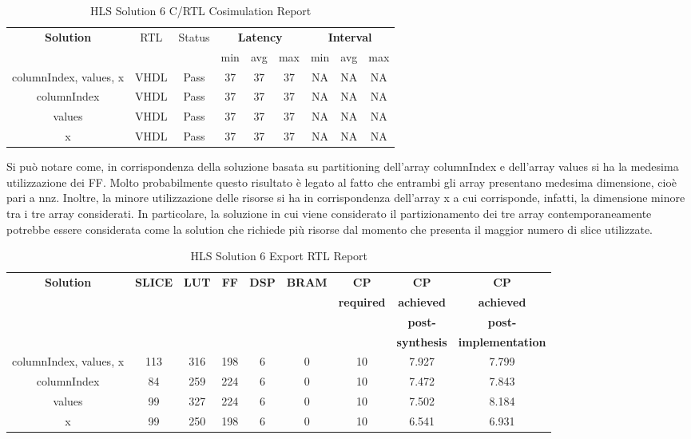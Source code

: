 \begin{table}[H]
	\centering
	\begin{tabular}{|c|c|c|c|c|c|c|c|c|}
		\hline
		\multicolumn{1}{|c|}{\textbf{Solution}} & \multicolumn{1}{|c|}{RTL} & \multicolumn{1}{|c|}{Status} & \multicolumn{3}{c|}{\textbf{Latency}} & \multicolumn{3}{c|}{\textbf{Interval}} \\
		& &  & min & avg & max & min & avg & max \\
		\hline
		columnIndex, values, x & VHDL & Pass & 37 & 37 & 37 & NA & NA & NA \\
		\hline
		columnIndex & VHDL & Pass & 37 & 37 & 37 & NA & NA & NA \\
		\hline
		values & VHDL & Pass & 37 & 37 & 37 & NA & NA & NA \\
		\hline
		x & VHDL & Pass & 37 & 37 & 37 & NA & NA & NA \\
		\hline
	\end{tabular}
	\caption{HLS Solution 6 C/RTL Cosimulation Report }
	\label{tab:hls-solution-6-cosimulation-report}
\end{table}

Si può notare come, in corrispondenza della soluzione basata su partitioning dell'array columnIndex e dell'array values si ha la medesima utilizzazione dei FF. Molto probabilmente questo risultato è legato al fatto che entrambi gli array presentano medesima dimensione, cioè pari a nnz. Inoltre, la minore utilizzazione delle risorse si ha in corrispondenza dell'array x a cui corrisponde, infatti, la dimensione minore tra i tre array considerati. In particolare, la soluzione in cui viene considerato il partizionamento dei tre array contemporaneamente potrebbe essere considerata come la solution che richiede più risorse dal momento che presenta il maggior numero di slice utilizzate.

\begin{table}[H]
	\centering
	\begin{tabular}{|c|c|c|c|c|c|c|c|c|}
		\hline
		\textbf{Solution} & \textbf{SLICE} & \textbf{LUT} & \textbf{FF} & \textbf{DSP} & \textbf{BRAM} & \textbf{CP} & \textbf{CP} & \textbf{CP} \\
		& & & & & & \textbf{required} & \textbf{achieved} & \textbf{achieved}\\
		& & & & & & & \textbf{post-} & \textbf{post-}\\
		& & & & & & & \textbf{synthesis} & \textbf{implementation}\\
		\hline
		columnIndex, values, x  & 113 & 316 & 198 & 6 & 0 & 10 & 7.927 & 7.799 \\
		\hline
		columnIndex  & 84 & 259 & 224 & 6 & 0 & 10 & 7.472 & 7.843 \\
		\hline
		values  & 99 & 327 & 224 & 6 & 0 & 10 & 7.502 & 8.184 \\
		\hline
		x  & 99 & 250 & 198 & 6 & 0 & 10 & 6.541 & 6.931 \\
		\hline
	\end{tabular}
	\caption{HLS Solution 6 Export RTL Report}
	\label{tab:hls-solution-6-export-rtl-report}
\end{table}